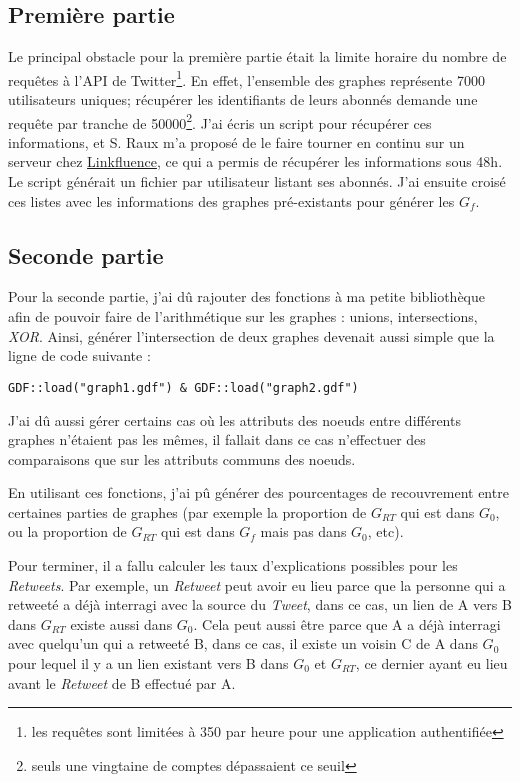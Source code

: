 \documentclass[]{article}
\begin{document}
\subsection{Première partie}

Le principal obstacle pour la première partie était la limite horaire du
nombre de requêtes à l'API de Twitter\footnote{les requêtes sont
 limitées à 350 par heure pour une application authentifiée}. En effet,
l'ensemble des graphes représente 7000 utilisateurs uniques; récupérer
les identifiants de leurs abonnés demande une requête par tranche de
50000\footnote{seuls une vingtaine de comptes dépassaient ce seuil}.
J'ai écris un script pour récupérer ces informations, et S. Raux m'a
proposé de le faire tourner en continu sur un serveur chez
\href{http://fr.linkfluence.net/}{Linkfluence}, ce qui a permis de
récupérer les informations sous 48h. Le script générait un fichier par
utilisateur listant ses abonnés. J'ai ensuite croisé ces listes avec les
informations des graphes pré-existants pour générer les $G_{f}$.

\subsection{Seconde partie}

Pour la seconde partie, j'ai dû rajouter des fonctions à ma petite
bibliothèque afin de pouvoir faire de l'arithmétique sur les graphes :
unions, intersections, \emph{XOR}. Ainsi, générer l'intersection de deux
graphes devenait aussi simple que la ligne de code suivante :

\begin{verbatim}
GDF::load("graph1.gdf") & GDF::load("graph2.gdf")
\end{verbatim}
J'ai dû aussi gérer certains cas où les attributs des noeuds entre
différents graphes n'étaient pas les mêmes, il fallait dans ce cas
n'effectuer des comparaisons que sur les attributs communs des noeuds.

En utilisant ces fonctions, j'ai pû générer des pourcentages de
recouvrement entre certaines parties de graphes (par exemple la
proportion de $G_{RT}$ qui est dans $G_{0}$, ou la proportion de $G_{RT}$ qui est
dans $G_{f}$ mais pas dans $G_{0}$, etc).

Pour terminer, il a fallu calculer les taux d'explications possibles
pour les \emph{Retweets}. Par exemple, un \emph{Retweet} peut avoir eu
lieu parce que la personne qui a retweeté a déjà interragi avec la
source du \emph{Tweet}, dans ce cas, un lien de A vers B dans $G_{RT}$
existe aussi dans $G_{0}$. Cela peut aussi être parce que A a déjà 
interragi avec quelqu'un qui a retweeté B, dans ce cas, il existe un
voisin C de A dans $G_{0}$ pour lequel il y a un lien existant vers B dans
$G_{0}$ et $G_{RT}$, ce dernier ayant eu lieu avant le \emph{Retweet} de B
effectué par A.
\end{document}
